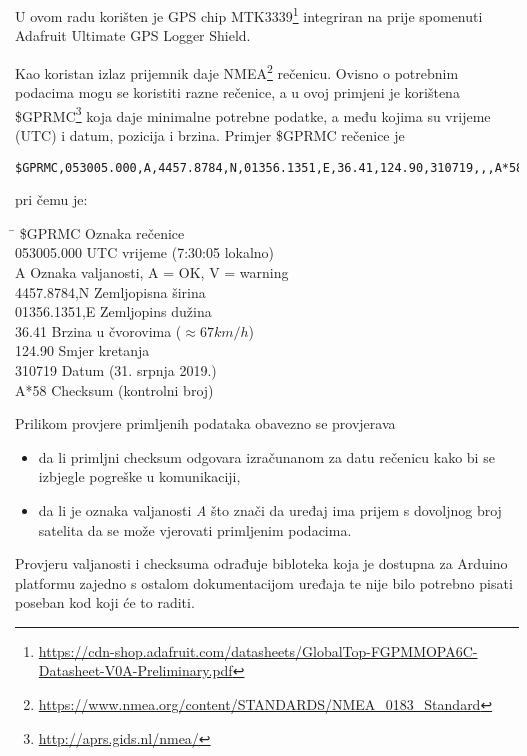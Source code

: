 U ovom radu korišten je GPS chip MTK3339\footnote{\url{https://cdn-shop.adafruit.com/datasheets/GlobalTop-FGPMMOPA6C-Datasheet-V0A-Preliminary.pdf}} integriran na prije spomenuti Adafruit Ultimate GPS Logger Shield.


Kao koristan izlaz prijemnik daje NMEA\footnote{\url{https://www.nmea.org/content/STANDARDS/NMEA_0183_Standard}} rečenicu. 
Ovisno o potrebnim podacima mogu se koristiti razne rečenice, a u ovoj primjeni je korištena \$GPRMC\footnote{\url{http://aprs.gids.nl/nmea/}} koja daje minimalne potrebne podatke, a među kojima su vrijeme (UTC) i datum, pozicija i brzina.
Primjer \$GPRMC rečenice je \begin{verbatim}
$GPRMC,053005.000,A,4457.8784,N,01356.1351,E,36.41,124.90,310719,,,A*58
\end{verbatim}
pri čemu je:
\begin{tabbing}
\hspace{80pt}\=\kill
 \$GPRMC \> Oznaka rečenice \\ 
 053005.000 \> UTC vrijeme (7:30:05 lokalno)\\ 
 A \> Oznaka valjanosti, A = OK, V = warning \\ 
 4457.8784,N \> Zemljopisna širina \\ 
 01356.1351,E \> Zemljopins dužina \\ 
 36.41 \> Brzina u čvorovima ($\approx 67 km/h$)\\ 
 124.90 \> Smjer kretanja \\
 310719 \> Datum (31. srpnja 2019.)\\
 A*58 \> Checksum (kontrolni broj)
\end{tabbing} 
Prilikom provjere primljenih podataka obavezno se provjerava
\begin{itemize}
\item da li primljni checksum odgovara izračunanom za datu rečenicu kako bi se izbjegle pogreške u komunikaciji,
\item da li je oznaka valjanosti \textit{A} što znači da uređaj ima prijem s dovoljnog broj satelita da se može vjerovati primljenim podacima.
\end{itemize}
Provjeru valjanosti i checksuma odrađuje bibloteka koja je dostupna za Arduino platformu zajedno s ostalom dokumentacijom uređaja te nije bilo potrebno pisati poseban kod koji će to raditi.

